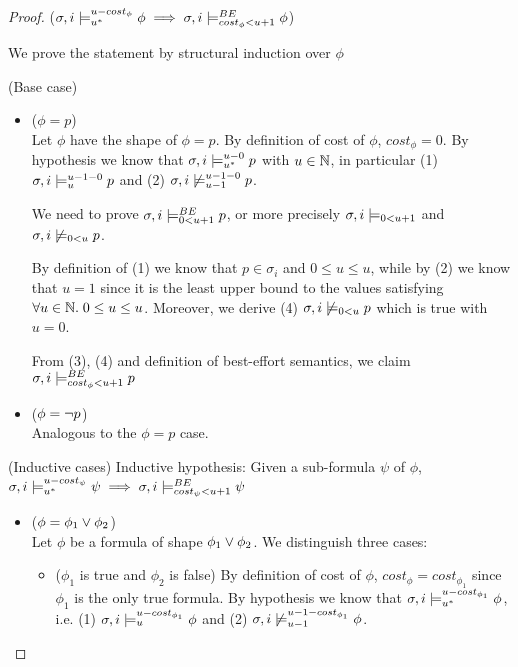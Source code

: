 \begin{theorem}
\begin{proof}
\noindent ($\sigma,i \models_{{u}^*}^{u-cost_\phi} \phi \implies \sigma,i \models_{cost_\phi < u + 1}^{BE} \phi$)

\noindent We prove the statement by structural induction over $\phi$

\noindent (Base case)
\begin{itemize}
    \item ($\phi = p$) \\
    Let $\phi$ have the shape of $\phi = p$.
    By definition of cost of $\phi$, $cost_\phi = 0$.
    By hypothesis we know that $\sigma,i \models_{{u}^*}^{u-0} p$ with $u \in \mathbb{N}$, in particular (1) $\sigma,i \models_{u}^{u-1-0} p$ and (2) $\sigma,i \not\models_{u-1}^{u-1-0} p$.

    We need to prove $\sigma,i \models_{0 < u + 1}^{BE} p$, or more precisely $\sigma,i \models_{0 < u + 1}$ and $\sigma,i \not\models_{0 < u} p$.

    By definition of (1) we know that $p \in \sigma_i$ and $0 \leq u \leq u$, while by (2) we know that $u=1$ since it is the least upper bound to the values satisfying $\forall u \in \mathbb{N}.\; 0 \leq u \leq u$. 
    Moreover, we derive (4) $\sigma,i \not\models_{0 < u} p$ which is true with $u=0$.

    From (3), (4) and definition of best-effort semantics, we claim $\sigma,i \models_{cost_\phi < u + 1}^{BE} p$
    
    \item ($\phi = \neg p$) \\
    Analogous to the $\phi = p$ case.
\end{itemize}
    
\noindent (Inductive cases)
\noindent Inductive hypothesis: Given a sub-formula $\psi$ of $\phi$, $\sigma,i \models_{{u}^*}^{u-cost_\psi} \psi \implies \sigma,i \models_{cost_\psi < u + 1}^{BE} \psi$
\begin{itemize}
    \item ($\phi = \phi_1 \lor \phi_2$) \\
    Let $\phi$ be a formula of shape $\phi_1 \lor \phi_2$.
    We distinguish three cases:
    \begin{itemize}
        \item ($\phi_1$ is true and $\phi_2$ is false)
         By definition of cost of $\phi$, $cost_\phi = cost_{\phi_1}$ since $\phi_1$ is the only true formula.
         By hypothesis we know that $\sigma,i \models_{{u}^*}^{u-cost_{\phi_1}} \phi$, i.e. (1) $\sigma,i \models_{u}^{u-cost_{\phi_1}} \phi$ and (2) $\sigma,i \not\models_{u-1}^{u-1-cost_{\phi_1}} \phi$.
         

\end{itemize}
\end{itemize}
\end{proof}
\end{theorem}
